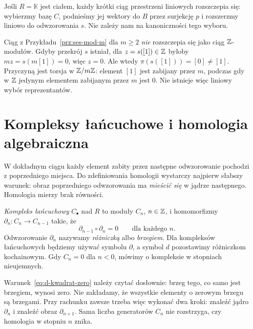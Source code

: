 \begin{uwaga}
Jeśli $R=\mathbb K$ jest ciałem, każdy krótki
ciąg przestrzeni liniowych rozszczepia się:
wybierzmy bazę $C$, podnieśmy jej wektory
do $B$ przez surjekcję $p$ i rozszerzmy
liniowo do odwzorowania $s$. Nie zależy nam na
kanoniczności tego wyboru.

Ciąg z Przykładu~\ref{prz:ses-mod-m} dla
$m\geq2$ \emph{nie} rozszczepia się jako
ciąg $\mathbb{Z}$-modułów. Gdyby przekrój $s$
istniał, dla $z=s([1])\in\mathbb{Z}$ byłoby
$mz=s(m[1])=0$, więc $z=0$.
Ale wtedy $\pi(s([1]))=[0]\ne[1]$.
Przyczyną jest torsja w $\mathbb{Z}/m\mathbb{Z}$: element $[1]$
jest zabijany przez $m$, podczas gdy w $\mathbb{Z}$
jedynym elementem zabijanym przez $m$ jest $0$.
Nie istnieje więc liniowy wybór reprezentantów.
\end{uwaga}
\section{Kompleksy łańcuchowe i homologia algebraiczna}
\label{sec:kompleks-homologia}

W dokładnym ciągu każdy element zabity przez
następne odwzorowanie pochodzi z poprzedniego miejsca.
Do zdefiniowania homologii wystarczy najpierw
słabszy warunek: obraz poprzedniego odwzorowania ma
\emph{mieścić się} w jądrze następnego.
Homologia mierzy brak równości.

\begin{definicja}
\label{def:kompleks-lancuchowy}
\emph{Kompleks łańcuchowy} $C_\bullet$ nad $R$
to moduły $C_n$, $n\in\mathbb{Z}$, i homomorfizmy
$\partial_n:C_n\to C_{n-1}$ takie, że
\begin{equation}\label{eq:d-kwadrat-zero}
 \partial_{n-1}\circ \partial_n=0\qquad\text{dla każdego }n.
\end{equation}
Odwzorowanie $\partial_n$ nazywamy \emph{różniczką} albo
\emph{brzegiem}. Dla kompleksów łańcuchowych
będziemy używać symbolu $\partial$, a symbol $d$
pozostawimy różniczkom kochainowym.
Gdy $C_n=0$ dla $n<0$,
mówimy o kompleksie w stopniach nieujemnych.
\end{definicja}

Warunek~\eqref{eq:d-kwadrat-zero} należy czytać
dosłownie: brzeg tego, co samo jest brzegiem,
wynosi zero. Nie zakładamy, że wszystkie
elementy o zerowym brzegu są brzegami.
Przy rachunku zawsze trzeba więc wykonać dwa kroki:
znaleźć jądro $\partial_n$ i znaleźć obraz
$\partial_{n+1}$. Sama liczba generatorów $C_n$
nie rozstrzyga, czy homologia w stopniu $n$ znika.

